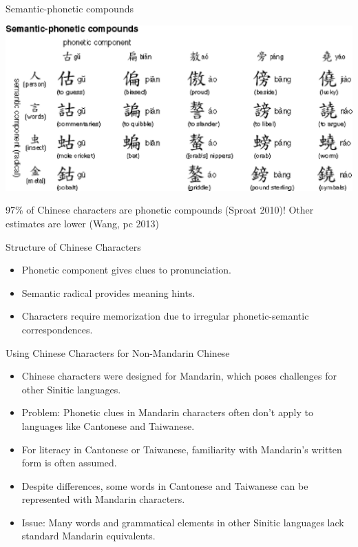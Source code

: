 \documentclass[xetex]{beamer}
\begin{document}
\begin{frame}{Semantic-phonetic compounds}
 \begin{center}
 \includegraphics[height=0.6\textheight]{pics/hanzi-4.eps}
\end{center}

97\% of Chinese characters are phonetic compounds (Sproat 2010)!  Other estimates are lower (Wang, pc 2013)
\end{frame}

\begin{frame}{Structure of Chinese Characters}
\begin{itemize}
    \item Phonetic component gives clues to pronunciation.
    \item Semantic radical provides meaning hints.
    \item Characters require memorization due to irregular phonetic-semantic correspondences.
\end{itemize}
\end{frame}

\begin{frame}{Using Chinese Characters for Non-Mandarin Chinese}
\begin{itemize}
    \item Chinese characters were designed for Mandarin, which poses challenges for other Sinitic languages.
    \item Problem: Phonetic clues in Mandarin characters often don’t apply to languages like Cantonese and Taiwanese.
    \item For literacy in Cantonese or Taiwanese, familiarity with Mandarin’s written form is often assumed.
    \item Despite differences, some words in Cantonese and Taiwanese can be represented with Mandarin characters.
    \item Issue: Many words and grammatical elements in other Sinitic languages lack standard Mandarin equivalents.
\end{itemize}
\end{frame}
\end{document}
